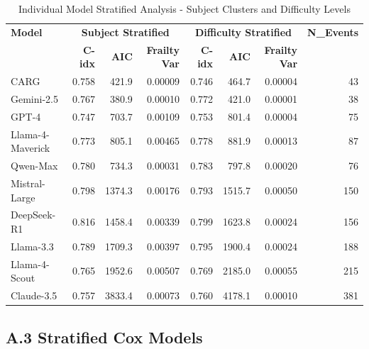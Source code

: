 \documentclass[letterpaper]{article}
\begin{document}
\begin{table}[ht]
\centering
\caption{Individual Model Stratified Analysis - Subject Clusters and Difficulty Levels}
\label{tab:stratified_results_detailed}
\begin{tabular}{lrrrrrrr}
\toprule
\textbf{Model} & \multicolumn{3}{c}{\textbf{Subject Stratified}} & \multicolumn{3}{c}{\textbf{Difficulty Stratified}} & \textbf{N\_Events} \\
\cmidrule(lr){2-4} \cmidrule(lr){5-7}
& \textbf{C-idx} & \textbf{AIC} & \textbf{Frailty Var} & \textbf{C-idx} & \textbf{AIC} & \textbf{Frailty Var} & \\
\midrule
CARG & 0.758 & 421.9 & 0.00009 & 0.746 & 464.7 & 0.00004 & 43 \\
Gemini-2.5 & 0.767 & 380.9 & 0.00010 & 0.772 & 421.0 & 0.00001 & 38 \\
GPT-4 & 0.747 & 703.7 & 0.00109 & 0.753 & 801.4 & 0.00004 & 75 \\
Llama-4-Maverick & 0.773 & 805.1 & 0.00465 & 0.778 & 881.9 & 0.00013 & 87 \\
Qwen-Max & 0.780 & 734.3 & 0.00031 & 0.783 & 797.8 & 0.00020 & 76 \\
Mistral-Large & 0.798 & 1374.3 & 0.00176 & 0.793 & 1515.7 & 0.00050 & 150 \\
DeepSeek-R1 & 0.816 & 1458.4 & 0.00339 & 0.799 & 1623.8 & 0.00024 & 156 \\
Llama-3.3 & 0.789 & 1709.3 & 0.00397 & 0.795 & 1900.4 & 0.00024 & 188 \\
Llama-4-Scout & 0.765 & 1952.6 & 0.00507 & 0.769 & 2185.0 & 0.00055 & 215 \\
Claude-3.5 & 0.757 & 3833.4 & 0.00073 & 0.760 & 4178.1 & 0.00010 & 381 \\
\bottomrule
\end{tabular}
\end{table}

\subsection*{A.3 Stratified Cox Models}
\end{document}
